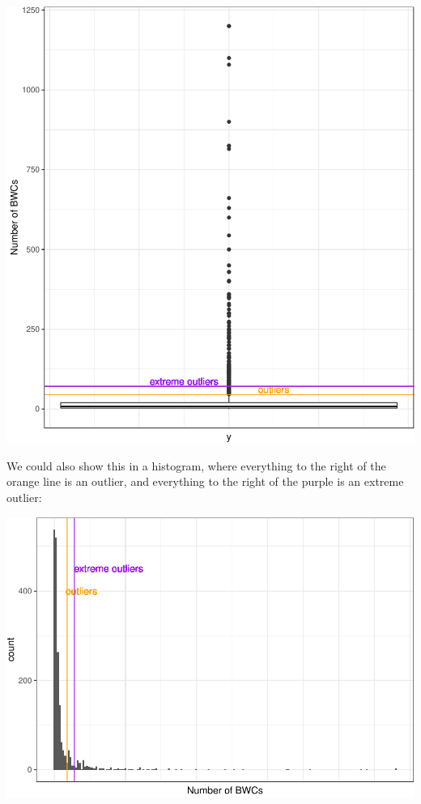 \documentclass[
]{book}
\begin{document}
\includegraphics{04-descriptive-statistics_files/figure-latex/unnamed-chunk-29-1.pdf}

We could also show this in a histogram, where everything to the right of the orange line is an outlier, and everything to the right of the purple is an extreme outlier:

\includegraphics{04-descriptive-statistics_files/figure-latex/unnamed-chunk-30-1.pdf}
\end{document}
